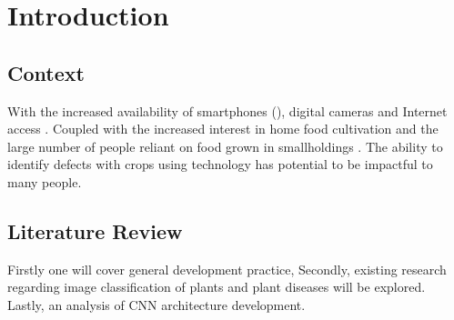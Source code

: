 \chapter{Introduction}
\label{introduction}

\section{Context}
  With the increased availability of smartphones (\cite{Statista:2021}), digital cameras \cite{ImarcGroup} and Internet access \cite{Wikipedia} \cite{Globaltt}. Coupled with the increased interest in home food cultivation \cite{Google} and the large number of people reliant on food grown in smallholdings \cite{JLIFADSmallHolders}. The ability to identify defects with crops using technology has potential to be impactful to many people.
\section{Literature Review}
  Firstly one will cover general development practice, Secondly, existing research regarding image classification of plants and plant diseases will be explored. Lastly, an analysis of CNN architecture development.
